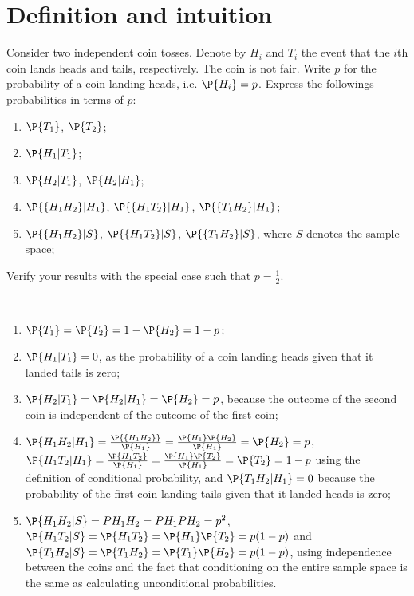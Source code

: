 \section{Definition and intuition}
\label{sec:section-2.1}

	\begin{exercise}\label{ex:chap02:01}
		Consider two independent coin tosses. Denote by $H_i$ and $T_i$ the event that the $i$th coin lands heads and tails, respectively. The coin is not fair. Write $p$ for the probability of a coin landing heads, i.e. $\P{H_i} = p$. Express the followings probabilities in terms of $p$:
		\begin{enumerate}
			\item $\P{T_1}$, $\P{T_2}$;
			\item $\P{H_1|T_1}$;
			\item $\P{H_2|T_1}$, $\P{H_2|H_1}$;
			\item $\P{\{H_1H_2\}|H_1}$, $\P{\{H_1T_2\}|H_1}$, $\P{\{T_1H_2\}|H_1}$;			
			\item $\P{\{H_1H_2\}|S}$, $\P{\{H_1T_2\}|S}$, $\P{\{T_1H_2\}|S}$, where $S$ denotes the sample space;
		\end{enumerate}
		Verify your results with the special case such that $p = \frac{1}{2}$.
		\begin{solution}~
			\begin{enumerate}
				\item $\P{T_1} = \P{T_2} = 1 - \P{H_2} = 1 - p$;
				\item $\P{H_1|T_1} = 0$, as the probability of a coin landing heads given that it landed tails is zero;
				\item $\P{H_2|T_1} = \P{H_2|H_1} = \P{H_2} = p$, because the outcome of the second coin is independent of the outcome of the first coin;
				\item $\P{H_1H_2|H_1} = \frac{\P{\{H_1H_2\}}}{\P{H_1}} = \frac{\P{H_1} \P{H_2}}{\P{H_1}} = \P{H_2} = p$, $\P{H_1T_2|H_1} = \frac{\P{H_1T_2}}{\P{H_1}} = \frac{\P{H_1} \P{T_2}}{\P{H_1}} = \P{T_2} = 1 - p$ using the definition of conditional probability, and $\P{T_1H_2|H_1} = 0$ because the probability of the first coin landing tails given that it landed heads is zero;
				\item $\P{H_1H_2|S} = P{H_1H_2} = P{H_1} P{H_2} = p^2$, $\P{H_1T_2|S} = \P{H_1T_2} = \P{H_1} \P{T_2} = p(1 - p)$ and $\P{T_1H_2|S} = \P{T_1H_2} = \P{T_1} \P{H_2} = p(1 - p)$, using independence between the coins and the fact that conditioning on the entire sample space is the same as calculating unconditional probabilities.
			\end{enumerate}
		\end{solution}
	\end{exercise}
	
